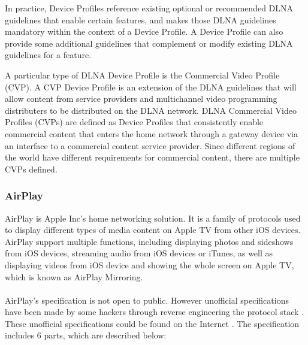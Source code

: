 \begin{enumerate}
In practice, Device Profiles reference existing optional or recommended DLNA guidelines that enable certain features, and makes those DLNA guidelines mandatory within the context of a Device Profile. 
A Device Profile can also provide some additional guidelines that complement or modify existing DLNA guidelines for a feature. 

A particular type of DLNA Device Profile is the Commercial Video Profile (CVP). A CVP Device Profile is an extension of the DLNA guidelines that will allow content from service providers and multichannel video programming distributers to be distributed on the DLNA network. DLNA Commercial Video Profiles (CVPs) are defined as Device Profiles that consistently enable commercial content that enters the home network through a gateway device via an interface to a commercial content service provider. Since different regions of the world have different requirements for commercial content, there are multiple CVPs defined. 

\end{enumerate} 

\subsubsection{AirPlay} 
AirPlay is Apple Inc's home networking solution. It is a family of protocols 
used to display different types of media content on Apple TV from other iOS devices. 
AirPlay support multiple functions, including displaying photos and sideshows from iOS devices, streaming audio from iOS devices or iTunes, as well as displaying videos from iOS device and 
showing the whole screen on Apple TV, which is known as AirPlay Mirroring. \\
\\
AirPlay's specification is not open to public. However unofficial specifications have been made by some hackers through reverse engineering the protocol stack \cite{AirPlay-spec}. These unofficial specifications could be found on the Internet \cite{AirPlay-spec}.  
The specification includes 6 parts, which are described below: 

